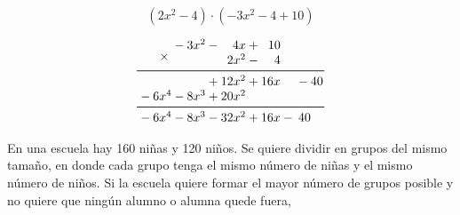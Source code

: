 \documentclass[11pt,addpoints]{exam}
\begin{document}
\begin{questions}
    \[(2x^2-4)\cdot(-3x^2-4+10)\]

    \begin{solutionbox}{5.5cm}
        \[ \begin{array}{*{16}{@{}>{{}}r<{{}}@{}}}
                 &  &   & \multirow{2.5}{*}{$ {}\times{} $} &  & - & 3x^2 &  & - & 4x    &  & + & 10  &   &    &    \\
                 &  &   &                                   &  &   &      &  &   & 2x^2  &  & - & 4   &   &    &    \\
                \cmidrule[0.6pt](l{-1pt}r{-1pt}){1-16}
                 &  &   &                                   &  &   &      &  & + & 12x^2 &  & + & 16x &   & -  & 40 \\
                 &  & - & 6x^4                              &  & - & 8x^3 &  & + & 20x^2 &  &   &     &   &    &    \\
                \cmidrule[0.6pt](l{-1pt}r{-1pt}){1-16}
                 &  & - & 6x^4                              &  & - & 8x^3 &  & - & 32x^2 &  & + & 16x & - & 40 &
            \end{array}
        \]
    \end{solutionbox}

    \newpage
    En una escuela hay 160 niñas y 120 niños. Se quiere dividir en grupos del mismo tamaño,
    en donde cada grupo tenga el mismo número de niñas y el mismo número de niños. Si la escuela quiere formar el mayor número de grupos posible
    y no quiere que ningún alumno o alumna quede fuera,

    \begin{parts}

\end{parts}
\end{questions}
\end{document}
